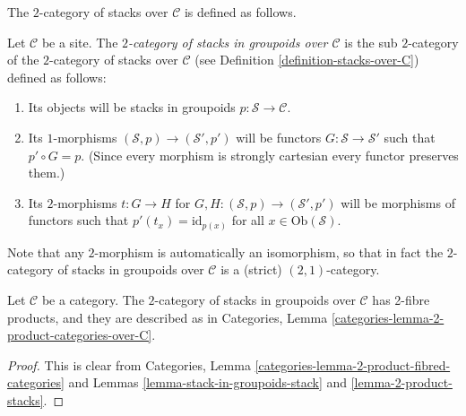 \noindent
The $2$-category of stacks over $\mathcal{C}$
is defined as follows.

\begin{definition}
\label{definition-stacks-in-groupoids-over-C}
Let $\mathcal{C}$ be a site.
The {\it $2$-category of stacks in groupoids over $\mathcal{C}$}
is the sub $2$-category of the $2$-category of stacks
over $\mathcal{C}$ (see Definition \ref{definition-stacks-over-C})
defined as follows:
\begin{enumerate}
\item Its objects will be stacks in groupoids
$p : \mathcal{S} \to \mathcal{C}$.
\item Its $1$-morphisms $(\mathcal{S}, p) \to (\mathcal{S}', p')$
will be functors $G : \mathcal{S} \to \mathcal{S}'$ such that
$p' \circ G = p$. (Since every morphism is strongly cartesian
every functor preserves them.)
\item Its $2$-morphisms $t : G \to H$ for
$G, H : (\mathcal{S}, p) \to (\mathcal{S}', p')$
will be morphisms of functors
such that $p'(t_x) = \text{id}_{p(x)}$
for all $x \in \text{Ob}(\mathcal{S})$.
\end{enumerate}
\end{definition}

\noindent
Note that any $2$-morphism is automatically an isomorphism, so
that in fact the $2$-category of stacks in groupoids over $\mathcal{C}$
is a (strict) $(2,1)$-category.

\begin{lemma}
\label{lemma-2-product-stacks-in-groupoids}
Let $\mathcal{C}$ be a category.
The $2$-category of stacks in groupoids over $\mathcal{C}$
has 2-fibre products, and they are described as in
Categories, Lemma \ref{categories-lemma-2-product-categories-over-C}.
\end{lemma}

\begin{proof}
This is clear from
Categories, Lemma \ref{categories-lemma-2-product-fibred-categories}
and Lemmas \ref{lemma-stack-in-groupoids-stack}
and \ref{lemma-2-product-stacks}.
\end{proof}



















